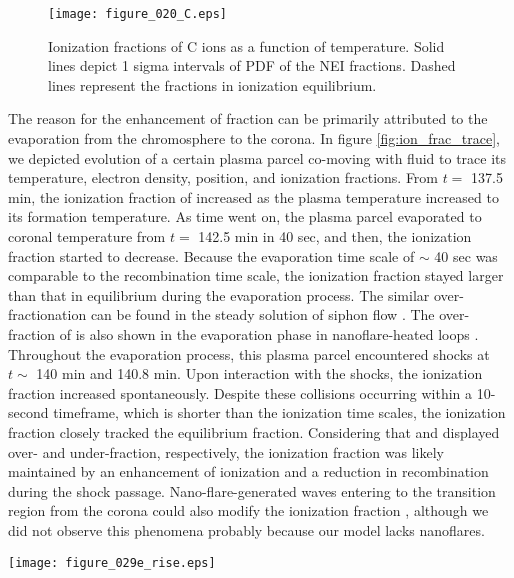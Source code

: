 \documentclass[fleqn,usenatbib]{mnras}
\begin{document}
\begin{figure}
	\texttt{[image: figure\_020\_C.eps]}
    \caption{Ionization fractions of C ions as a function of temperature.
    Solid lines depict 1 sigma intervals of PDF of the NEI fractions.
    Dashed lines represent the fractions in ionization equilibrium.
    }
    \label{fig:ion_frac_te}
\end{figure}

The reason for the enhancement of  fraction can be primarily attributed to the evaporation from the chromosphere to the corona.
In figure \ref{fig:ion_frac_trace}, we depicted evolution of a certain plasma parcel co-moving with fluid to trace its temperature, electron density, position, and ionization fractions.
From $t=$ 137.5 min, the ionization fraction of  increased as the plasma temperature increased to its formation temperature.
As time went on, the plasma parcel evaporated to coronal temperature from $t=$ 142.5 min in 40 sec, and then, the ionization fraction started to decrease.
Because the evaporation time scale of $\sim$ 40 sec was comparable to the recombination time scale, the ionization fraction stayed larger than that in equilibrium during the evaporation process.
The similar over-fractionation can be found in the steady solution of siphon flow \citep{1989ApJ...338.1131N, 1990ApJ...362..370S}.
The over-fraction of  is also shown in the evaporation phase in nanoflare-heated loops \cite{1993ApJ...402..741H}.
Throughout the evaporation process, this plasma parcel encountered shocks at $t\sim$ 140 min and 140.8 min. Upon interaction with the shocks, the  ionization fraction increased spontaneously. Despite these collisions occurring within a 10-second timeframe, which is shorter than the ionization time scales, the  ionization fraction closely tracked the equilibrium fraction.
Considering that  and  displayed over- and under-fraction, respectively, the  ionization fraction was likely maintained by an enhancement of ionization and a reduction in recombination during the shock passage.
Nano-flare-generated waves entering to the transition region from the corona could also modify the ionization fraction \citep{1993ApJ...402..741H}, although we did not observe this phenomena probably because our model lacks nanoflares. 

\begin{figure*}
	\texttt{[image: figure\_029e\_rise.eps]}
    \caption{ (a) Temperature (dashed line), electron density (dotted line), position (solid line), and (b) ionization fractions of a traced particle in the evaporation phase.
    The solid and the dotted lines in panel (b) indicate the ionization fraction in non-equilibrium and equilibrium, respectively.
    }
    \label{fig:ion_frac_trace}
\end{figure*}
\end{document}
